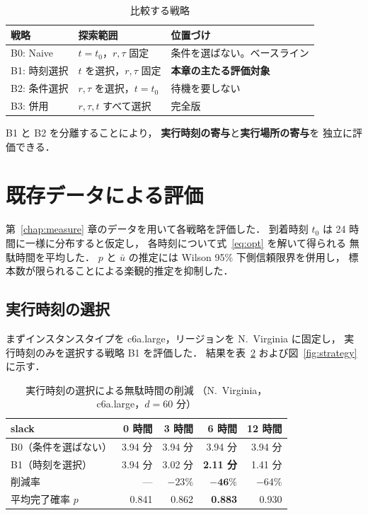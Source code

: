 \documentclass[11pt,a4paper]{ltjsreport}
\begin{document}
\begin{table}[htbp]
\centering
\caption{比較する戦略}
\label{tab:strategies}
\small
\begin{tabularx}{\textwidth}{@{}llX@{}}
\toprule
戦略 & 探索範囲 & 位置づけ \\
\midrule
B0: Naive
  & $t = t_0$，$r,\tau$ 固定
  & 条件を選ばない。ベースライン \\
\addlinespace
B1: 時刻選択
  & $t$ を選択，$r,\tau$ 固定
  & \textbf{本章の主たる評価対象} \\
\addlinespace
B2: 条件選択
  & $r,\tau$ を選択，$t = t_0$
  & 待機を要しない \\
\addlinespace
B3: 併用
  & $r,\tau,t$ すべて選択
  & 完全版 \\
\bottomrule
\end{tabularx}
\end{table}

B1 と B2 を分離することにより，
\textbf{実行時刻の寄与}と\textbf{実行場所の寄与}を
独立に評価できる．

\section{既存データによる評価}
\label{sec:eval}

第~\ref{chap:measure} 章のデータを用いて各戦略を評価した．
到着時刻 $t_0$ は 24 時間に一様に分布すると仮定し，
各時刻について式~\eqref{eq:opt} を解いて得られる
無駄時間を平均した．
$p$ と $\bar u$ の推定には Wilson 95\% 下側信頼限界を併用し，
標本数が限られることによる楽観的推定を抑制した．

\subsection{実行時刻の選択}
\label{sec:eval_b1}

まずインスタンスタイプを c6a.large，リージョンを N.~Virginia に固定し，
実行時刻のみを選択する戦略 B1 を評価した．
結果を表~\ref{tab:b1_result} および図~\ref{fig:strategy} に示す．

\begin{table}[htbp]
\centering
\caption{実行時刻の選択による無駄時間の削減
（N.~Virginia，c6a.large，$d = 60$ 分）}
\label{tab:b1_result}
\small
\begin{tabular}{@{}lrrrr@{}}
\toprule
slack & 0 時間 & 3 時間 & 6 時間 & 12 時間 \\
\midrule
B0（条件を選ばない） & 3.94 分 & 3.94 分 & 3.94 分 & 3.94 分 \\
B1（時刻を選択）     & 3.94 分 & 3.02 分 & \textbf{2.11 分} & 1.41 分 \\
\addlinespace
削減率               & ---     & $-23\%$ & $\mathbf{-46\%}$ & $-64\%$ \\
平均完了確率 $p$     & 0.841   & 0.862   & \textbf{0.883}  & 0.930 \\
\bottomrule
\end{tabular}
\end{table}
\end{document}

